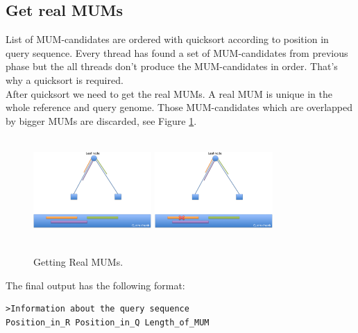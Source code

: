 \documentclass[3p,times]{elsarticle}
\begin{document}
\subsection*{Get real MUMs}
List of MUM-candidates are ordered with quicksort according to position in query sequence. Every thread has found a set of MUM-candidates from previous phase but the all threads don't produce the MUM-candidates in order. That's why a quicksort is required.\\
After quicksort we need to get the real MUMs. A real MUM is unique in the whole reference and query genome. Those MUM-candidates which are overlapped by bigger MUMs are discarded, see Figure \ref{real-mums}.\\
\begin{figure}[htb]  
\begin{center} 
  \includegraphics[width=4.5cm,height=4cm]{MUMs.png}
  \includegraphics[width=4.5cm,height=4cm]{Remove-MUMs.png}
\end{center} 
\caption{Getting Real MUMs.} 
\label{real-mums} 
\end{figure}
The final output has the following format:
\begin{verbatim} 
>Information about the query sequence
Position_in_R Position_in_Q Length_of_MUM
\end{verbatim}
\end{document}
